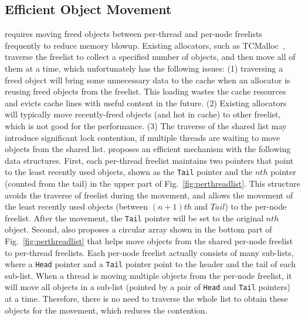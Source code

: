 \subsection{Efficient Object Movement} 
\label{sec:movement}
\NM{} requires moving freed objects between per-thread and per-node freelists frequently to reduce memory blowup. 
Existing allocators, such as TCMalloc~\cite{tcmalloc}, traverse the freelist to collect a specified number of objects, and then move all of them at a time, which unfortunately has the following issues: (1) traversing a freed object will bring some unnecessary data to the cache when an allocator is reusing freed objects from the freelist. This loading wastes the cache resources and evicts cache lines with useful content in the future. 
(2) Existing allocators will typically move recently-freed objects (and hot in cache) to other freelist, which is not good for the performance. (3) The traverse of the shared list may introduce significant lock contention, if multiple threads are waiting to move objects from the shared list. 
\NM{} proposes an efficient mechanism with the following data structures. First, each per-thread freelist maintains two pointers that point to the least recently used objects, shown as the \texttt{Tail} pointer and the $nth$ pointer (counted from the tail) in the upper part of  Fig.~\ref{fig:perthreadlist}. 
This structure avoids the traverse of freelist during the movement, and allows the movement of the least recently used objects (between $(n+1)th$ and $Tail$) to the per-node freelist. After the movement, the \texttt{Tail} pointer will be set to the original $nth$ object. 
Second, \NM{} also proposes a circular array shown in the bottom part of Fig.~\ref{fig:perthreadlist} that helps move objects from the shared per-node  freelist to per-thread freelists. 
Each per-node freelist actually consists of many sub-lists, where a \texttt{Head} pointer and a \texttt{Tail} pointer point to the header and the tail of each sub-list. When a thread is moving multiple objects from the per-node freelist, it will move all objects in a sub-list (pointed by a pair of \texttt{Head} and \texttt{Tail} pointers) at a time. Therefore, there is no need to traverse the whole list to obtain these objects for the movement, which reduces the contention. 


